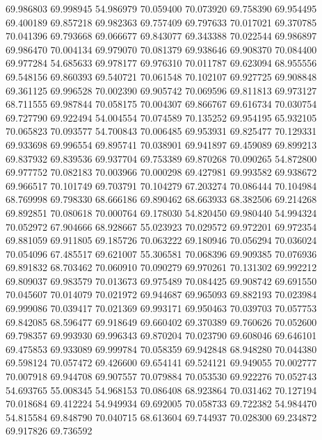 69.986803
69.998945
54.986979
70.059400
70.073920
69.758390
69.954495
69.400189
69.857218
69.982363
69.757409
69.797633
70.017021
69.370785
70.041396
69.793668
69.066677
69.843077
69.343388
70.022544
69.986897
69.986470
70.004134
69.979070
70.081379
69.938646
69.908370
70.084400
69.977284
54.685633
69.978177
69.976310
70.011787
69.623094
68.955556
69.548156
69.860393
69.540721
70.061548
70.102107
69.927725
69.908848
69.361125
69.996528
70.002390
69.905742
70.069596
69.811813
69.973127
68.711555
69.987844
70.058175
70.004307
69.866767
69.616734
70.030754
69.727790
69.922494
54.004554
70.074589
70.135252
69.954195
65.932105
70.065823
70.093577
54.700843
70.006485
69.953931
69.825477
70.129331
69.933698
69.996554
69.895741
70.038901
69.941897
69.459089
69.899213
69.837932
69.839536
69.937704
69.753389
69.870268
70.090265
54.872800
69.977752
70.082183
70.003966
70.000298
69.427981
69.993582
69.938672
69.966517
70.101749
69.703791
70.104279
67.203274
70.086444
70.104984
68.769998
69.798330
68.666186
69.890462
68.663933
68.382506
69.214268
69.892851
70.080618
70.000764
69.178030
54.820450
69.980440
54.994324
70.052972
67.904666
68.928667
55.023923
70.029572
69.972201
69.972354
69.881059
69.911805
69.185726
70.063222
69.180946
70.056294
70.036024
70.054096
67.485517
69.621007
55.306581
70.068396
69.909385
70.076936
69.891832
68.703462
70.060910
70.090279
69.970261
70.131302
69.992212
69.809037
69.983579
70.013673
69.975489
70.084425
69.908742
69.691550
70.045607
70.014079
70.021972
69.944687
69.965093
69.882193
70.023984
69.999086
70.039417
70.021369
69.993171
69.950463
70.039703
70.057753
69.842085
68.596477
69.918649
69.660402
69.370389
69.760626
70.052600
69.798357
69.993930
69.996343
69.870204
70.023790
69.608046
69.646101
69.475853
69.933089
69.999784
70.058359
69.942848
68.948280
70.044380
69.598124
70.057472
69.426600
69.654141
69.524121
69.949055
70.002777
70.007918
69.944708
69.907557
70.079884
70.053530
69.922276
70.052743
54.693765
55.008345
54.968153
70.086408
68.923864
70.031462
70.127194
70.018684
69.412224
54.949934
69.692005
70.058733
69.722382
54.984470
54.815584
69.848790
70.040715
68.613604
69.744937
70.028300
69.234872
69.917826
69.736592
